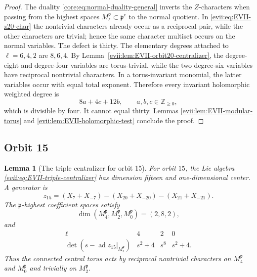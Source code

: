 \documentclass[11pt,reqno]{amsart}
\numberwithin{equation}{section}
\newtheorem{lemma}[theorem]{Lemma}
\theoremstyle{definition}
\theoremstyle{remark}
\newcommand{\Z}{\mathbb Z}
\newcommand{\ad}{\operatorname{ad}}
\newcommand{\fp}{\mathfrak p}
\begin{document}
\begin{proof}
The duality \eqref{core:eq:normal-duality-general} inverts the $Z$-characters when
passing from the highest spaces $M_\ell^{\fp}\subset\fp^e$ to the normal
quotient.  In \eqref{evii:eq:EVII-z20-char} the nontrivial characters already occur
as a reciprocal pair, while the other characters are trivial; hence the same
character multiset occurs on the normal variables.  The defect is thirty.  The elementary degrees attached to
$\ell=6,4,2$ are $8,6,4$.  By Lemma~\ref{evii:lem:EVII-orbit20-centralizer}, the
degree-eight and degree-four variables are torus-trivial, while the two
degree-six variables have reciprocal nontrivial characters.  In a torus-invariant
monomial, the latter variables occur with equal total exponent.  Therefore every
invariant holomorphic weighted degree is
\[
 8a+4c+12b,
 \qquad a,b,c\in\Z_{\ge0},
\]
which is divisible by four.  It cannot equal thirty.  Lemmas
\ref{evii:lem:EVII-modular-torus} and \ref{evii:lem:EVII-holomorphic-test} conclude the
proof.
\end{proof}

\subsection{Orbit 15}

\begin{lemma}[The triple centralizer for orbit 15]\label{evii:lem:EVII-orbit15-centralizer}
For orbit $15$, the Lie algebra \eqref{evii:eq:EVII-triple-centralizer} has dimension
fifteen and one-dimensional center.  A generator is
\begin{equation}\label{evii:eq:EVII-z15}
 z_{15}=(X_7+X_{-7})-(X_{20}+X_{-20})-(X_{21}+X_{-21}).
\end{equation}
The $\fp$-highest coefficient spaces satisfy
\[
 \dim(M_4^{\fp},M_2^{\fp},M_0^{\fp})=(2,8,2),
\]
and
\begin{equation}\label{evii:eq:EVII-z15-char}
\begin{array}{c|ccc}
\ell&4&2&0\\ \hline
\det(s-\ad z_{15}|_{M_\ell^{\fp}})&s^2+4&s^8&s^2+4.
\end{array}
\end{equation}
Thus the connected central torus acts by reciprocal nontrivial characters on
$M_4^{\fp}$ and $M_0^{\fp}$ and trivially on $M_2^{\fp}$.
\end{lemma}
\end{document}
